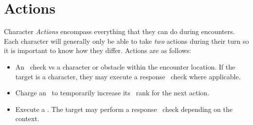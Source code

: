 \section{Actions}\label{sec:actions}
Character \emph{Actions} encompass everything that they can do during encounters. Each character will generally only be able to take \emph{two} actions during their turn so it is important to know how they differ. Actions are as follows:
\begin{itemize}
	\item An \attribute\ check vs a character or obstacle within the encounter location. If the target is a character, they may execute a response \attribute\ check where applicable.
	\item Charge an \attribute\ to temporarily increase its \BURST\ rank for the next action.
	\item Execute a \techn{}. The target may perform a response \attribute\ check depending on the context.
\end{itemize}